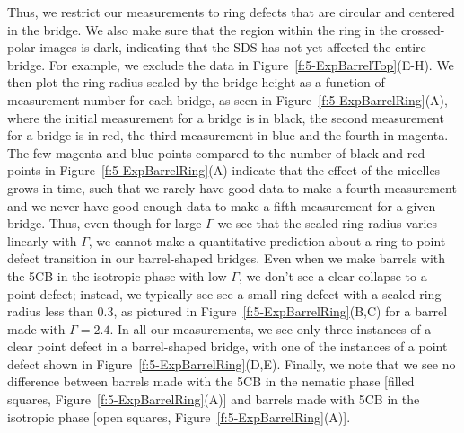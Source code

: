 Thus, we restrict our measurements to ring defects that are circular and centered in the bridge.
We also make sure that the region within the ring in the crossed-polar images is dark, indicating that the SDS has not yet affected the entire bridge.
For example, we exclude the data in Figure~\ref{f:5-ExpBarrelTop}(E-H).
We then plot the ring radius scaled by the bridge height as a function of measurement number for each bridge, as seen in Figure~\ref{f:5-ExpBarrelRing}(A), where the initial measurement for a bridge is in black, the second measurement for a bridge is in red, the third measurement in blue and the fourth in magenta.
The few magenta and blue points compared to the number of black and red points in Figure~\ref{f:5-ExpBarrelRing}(A) indicate that the effect of the micelles grows in time, such that we rarely have good data to make a fourth measurement and we never have good enough data to make a fifth measurement for a given bridge.
Thus, even though for large $\Gamma$ we see that the scaled ring radius varies linearly with $\Gamma$, we cannot make a quantitative prediction about a ring-to-point defect transition in our barrel-shaped bridges.
Even when we make barrels with the 5CB in the isotropic phase with low $\Gamma$, we don't see a clear collapse to a point defect; instead, we typically see see a small ring defect with a scaled ring radius less than $0.3$, as pictured in Figure~\ref{f:5-ExpBarrelRing}(B,C) for a barrel made with $\Gamma = 2.4$.
In all our measurements, we see only three instances of a clear point defect in a barrel-shaped bridge, with one of the instances of a point defect shown in Figure~\ref{f:5-ExpBarrelRing}(D,E).
Finally, we note that we see no difference between barrels made with the 5CB in the nematic phase [filled squares, Figure~\ref{f:5-ExpBarrelRing}(A)] and barrels made with 5CB in the isotropic phase [open squares, Figure~\ref{f:5-ExpBarrelRing}(A)].
